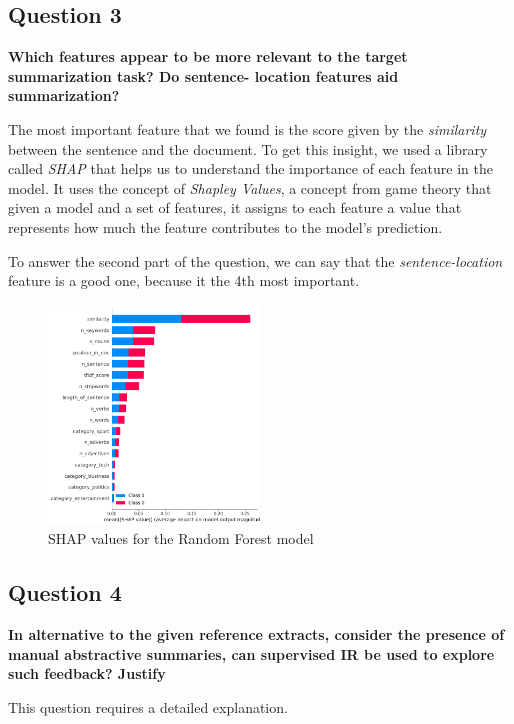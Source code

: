 \subsection{Question 3}
\textbf{Which features appear to be more relevant to the target summarization task? Do sentence- location features aid summarization?}

The most important feature that we found is the score given by the \textit{similarity} between the sentence and the document. To get this 
insight, we used a library called \textit{SHAP} that helps us to understand the importance of each feature in the model. It uses the concept of 
\textit{Shapley Values}, a concept from game theory that given a model and a set of features, it assigns to each feature a value that represents
how much the feature contributes to the model's prediction. 

To answer the second part of the question, we can say that the \textit{sentence-location} feature is a good one, because it the 4th most important.

\begin{figure}[H]
  \centering
  \includegraphics[width=0.5\textwidth]{images/shap.png}
  \caption{SHAP values for the Random Forest model}
  \label{fig:shap_values}
\end{figure}

\subsection{Question 4}
\textbf{In alternative to the given reference extracts, consider the presence of manual abstractive summaries, can supervised IR be used to explore such feedback? Justify}

This question requires a detailed explanation.